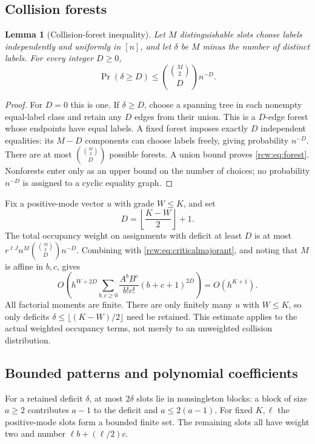 \documentclass[11pt]{article}
\newtheorem{lemma}[theorem]{Lemma}
\theoremstyle{definition}\newtheorem{definition}[theorem]{Definition}
\theoremstyle{remark}\newtheorem{remark}[theorem]{Remark}
\numberwithin{equation}{section}
\begin{document}
\subsection{Collision forests}
\begin{lemma}[Collision-forest inequality]\label{rcw:lem:forest}
Let $M$ distinguishable slots choose labels independently and uniformly in $[n]$, and let $\delta$ be $M$ minus the number of distinct labels. For every integer $D\ge0$,
\begin{equation}\label{rcw:eq:forest}
 \Pr(\delta\ge D)\le
   \binom{\binom M2}{D}n^{-D}.
\end{equation}
\end{lemma}
\begin{proof}
For $D=0$ this is one. If $\delta\ge D$, choose a spanning tree in each nonempty equal-label class and retain any $D$ edges from their union. This is a $D$-edge forest whose endpoints have equal labels. A fixed forest imposes exactly $D$ independent equalities: its $M-D$ components can choose labels freely, giving probability $n^{-D}$. There are at most $\binom{\binom M2}{D}$ possible forests. A union bound proves \eqref{rcw:eq:forest}. Nonforests enter only as an upper bound on the number of choices; no probability $n^{-D}$ is assigned to a cyclic equality graph.
\end{proof}

Fix a positive-mode vector $u$ with grade $W\le K$, and set
\[
 D=\left\lfloor\frac{K-W}{2}\right\rfloor+1.
\]
The total occupancy weight on assignments with deficit at least $D$ is at most
$r^{\ell J}n^M\binom{\binom M2}{D}n^{-D}$. Combining with \eqref{rcw:eq:criticalmajorant}, and noting that $M$ is affine in $b,c$, gives
\begin{equation}\label{rcw:eq:collisiontail}
 O\!\left(h^{W+2D}
   \sum_{b,c\ge0}\frac{A^bB^c}{b!c!}(b+c+1)^{2D}\right)
 =O(h^{K+1}).
\end{equation}
All factorial moments are finite. There are only finitely many $u$ with $W\le K$, so only deficits $\delta\le\lfloor(K-W)/2\rfloor$ need be retained. This estimate applies to the actual weighted occupancy terms, not merely to an unweighted collision distribution.

\subsection{Bounded patterns and polynomial coefficients}
For a retained deficit $\delta$, at most $2\delta$ slots lie in nonsingleton blocks: a block of size $a\ge2$ contributes $a-1$ to the deficit and $a\le2(a-1)$. For fixed $K,\ell$ the positive-mode slots form a bounded finite set. The remaining slots all have weight two and number $\ell b+(\ell/2)c$.
\end{document}
